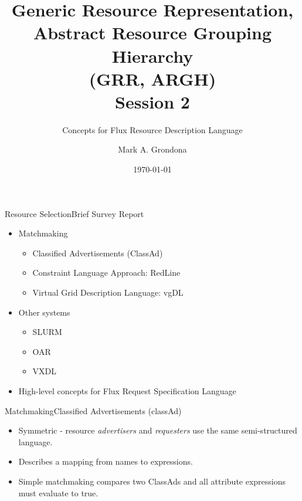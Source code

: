 \documentclass{beamer}
\begin{document}
\title[GRR, ARGH. Session 2]{Generic Resource Representation,\\
                  Abstract Resource Grouping Hierarchy \\
                  (GRR, ARGH) \\ 
                  Session 2}
\subtitle{Concepts for Flux Resource Description Language}
\author[Grondona]{Mark A. Grondona}
\date{\today}


\maketitle

\begin{frame}{Resource Selection}{Brief Survey Report}
\begin{itemize}
 \item Matchmaking
 \begin{itemize}
  \item {Classified Advertisements (ClassAd)}
  \item {Constraint Language Approach: RedLine}
  \item {Virtual Grid Description Language: vgDL}
 \end{itemize}
 \item Other systems
 \begin{itemize}
  \item {SLURM}
  \item {OAR}
  \item {VXDL}
 \end{itemize}
 \item High-level concepts for Flux Request Specification Language
\end{itemize}
\end{frame}

%
\begin{frame}{Matchmaking}{Classified Advertisements (classAd)}
\begin{itemize}
  \item<+-> Symmetric - resource {\em advertisers} and {\em requesters} use
          the same semi-structured language.
  \item<+-> Describes a mapping from names to expressions.
  \item<+-> Simple matchmaking compares two ClassAds and all attribute
            expressions must evaluate to true.
\end{itemize}
\end{frame}
\end{document}
